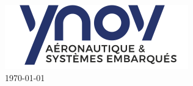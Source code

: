 \documentclass[
11pt, %
french, %
singlespacing, %
headsepline, %
]{MastersDoctoralThesis} %
\begin{document}
\begin{titlepage}
\begin{center}
\includegraphics[scale=0.7]{Figures/Logo_Ynov.png}\\[1cm] %

{\large \today}\\[4cm] %


\vfill
\end{center}
\end{titlepage}



\end{document}
